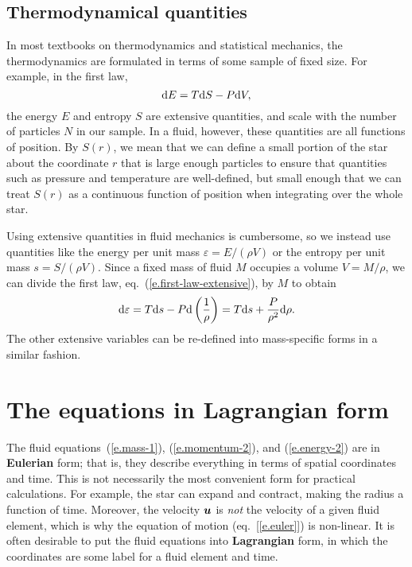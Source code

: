 
\subsection{Thermodynamical quantities}

In most textbooks on thermodynamics and statistical mechanics, the thermodynamics are formulated in terms of some sample of fixed size. For example, in the first law,
\begin{equation}\label{e.first-law-extensive}
\mathrm{d} E = T\mathrm{d} S - P\mathrm{d} V,
\end{equation}
the energy $E$ and entropy $S$ are extensive quantities, and scale with the number of particles $N$ in our sample. In a fluid, however, these quantities are all functions of position. By $S(r)$, we mean that we can define a small portion of the star about the coordinate $r$ that is large enough particles to ensure that quantities such as pressure and temperature are well-defined, but small enough that we can treat $S(r)$ as a continuous function of position when integrating over the whole star.

Using extensive quantities in fluid mechanics is cumbersome, so we instead use quantities like the energy per unit mass $\varepsilon  = E/(\rho V)$ or the entropy per unit mass $s = S/(\rho V)$. Since a fixed mass of fluid $M$ occupies a volume $V = M/\rho$, we can divide the first law, eq.~(\ref{e.first-law-extensive}), by $M$ to obtain
\begin{equation}\label{e.first-law-intensive}
\mathrm{d} \varepsilon = T\mathrm{d} s - P\mathrm{d}\left(\frac{1}{\rho}\right) = T\mathrm{d} s + \frac{P}{\rho^{2}}\mathrm{d} \rho.
\end{equation}
The other extensive variables can be re-defined into mass-specific forms in a similar fashion.

\section{The equations in Lagrangian form}

The fluid equations~(\ref{e.mass-1}), (\ref{e.momentum-2}), and (\ref{e.energy-2}) are in \textbf{Eulerian} form; that is, they describe everything in terms of spatial coordinates and time. This is not necessarily the most convenient form for  practical calculations. For example, the star can expand and contract, making the radius a function of time. Moreover, the velocity $\boldsymbol{u}$ is \emph{not} the velocity of a given fluid element, which is why the equation of motion (eq.~[\ref{e.euler}]) is non-linear. It is often desirable to put the fluid equations into \textbf{Lagrangian} form, in which the coordinates are some label for a fluid element and time.

